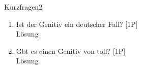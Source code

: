 \begin{exercise}{Kurzfragen}{2}
  \begin{enumerate}
    \item Ist der Genitiv ein deutscher Fall?
      \hfill [1P]
      \ifdisplaysolutions
        \\ Lösung
      \else
        \vspace{4cm}
      \fi

    \item Gbt es einen Genitiv von toll?
      \hfill [1P]
      \ifdisplaysolutions
        \\ Lösung
      \else
        \vspace{4cm}
      \fi
  \end{enumerate}
\end{exercise}
